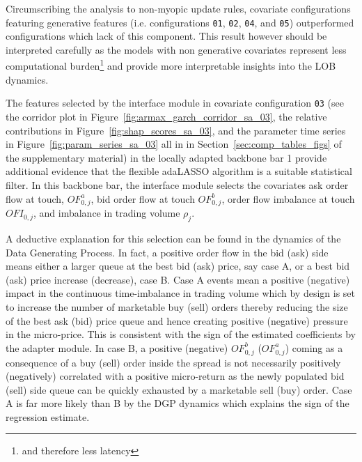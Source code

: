 \documentclass[10pt,a4paper,oneside]{article}
\begin{document}
Circumscribing the analysis to non-myopic update rules, covariate configurations featuring generative features (i.e. configurations \verb|01|, \verb|02|, \verb|04|, and \verb|05|) outperformed configurations which lack of this component. This result however should be interpreted carefully as the models with non generative covariates represent less computational burden\footnote{and therefore less latency} and provide more interpretable insights into the LOB dynamics.

The features selected by the interface module in covariate configuration \verb|03| (see the corridor plot in Figure~\ref{fig:armax_garch_corridor_sa_03}, the relative contributions in Figure~\ref{fig:shap_scores_sa_03}, and the parameter time series in Figure~\ref{fig:param_series_sa_03} all in in Section~\ref{sec:comp_tables_figs} of the supplementary material) in the locally adapted backbone bar 1 provide additional evidence that the flexible adaLASSO algorithm is a suitable statistical filter. In this backbone bar, the interface module selects the covariates ask order flow at touch, $OF^{a}_{0,j}$, bid order flow at touch $OF^b_{0, j}$, order flow imbalance at touch $OFI_{0,j}$, and imbalance in trading volume $\rho_j$.

A deductive explanation for this selection can be found in the dynamics of the Data Generating Process. In fact, a positive order flow in the bid (ask) side means either a larger queue at the best bid (ask) price, say case A, or a best bid (ask) price increase (decrease), case B. Case A events mean a positive (negative) impact in the continuous time-imbalance in trading volume which by design is set to increase the number of marketable buy (sell) orders thereby reducing the size of the best ask (bid) price queue and hence creating positive (negative) pressure in the micro-price. This is consistent with the sign of the estimated coefficients by the adapter module. In case B, a positive (negative) $OF^{b}_{0, j}$ ($OF^a_{0, j}$) coming as a consequence of a buy (sell) order inside the spread is not necessarily positively (negatively) correlated with a positive micro-return as the newly populated bid (sell) side queue can be quickly exhausted by a marketable sell (buy) order. Case A is far more likely than B by the DGP dynamics which explains the sign of the regression estimate.
\end{document}
